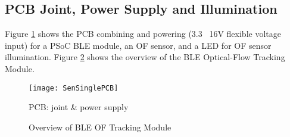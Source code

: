 \subsection{PCB Joint, Power Supply and Illumination}
%
Figure \ref{SenSinglePCB} shows the PCB combining and powering (3.3 \texttildelow \, 16V flexible voltage input) for a PSoC BLE module, an OF sensor, and a LED for OF sensor illumination. Figure \ref{BLE_OF_TrackingModule_Overview} shows the overview of the BLE Optical-Flow Tracking Module.
%
\begin{figure}[H]
\centering
\texttt{[image: SenSinglePCB]}
\caption{PCB: joint \& power supply}
\label{SenSinglePCB}
\end{figure}%
%
%
 \begin{figure}[H]
\hspace*{-0.3cm}
\centering
{}
{}
%
\caption{Overview of BLE OF Tracking Module}
\label{BLE_OF_TrackingModule_Overview}
\end{figure}%
%
%
%
%
%
%
%





































